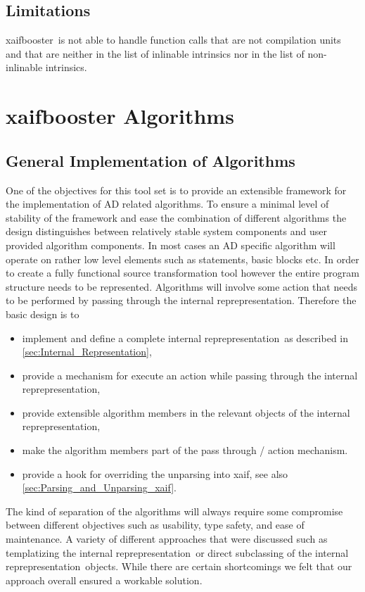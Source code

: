 \documentclass{book}
\newcommand{\InternalRep}{internal reprepresentation}
\newcommand{\xaif}{xaif}
\newcommand{\xaifbooster}{xaifbooster}
\begin{document}
\section{Limitations}
\label{sec:xaifbooster_limitations}

\xaifbooster~is not able to handle function calls that are not
compilation units
and that are neither
in the list of inlinable intrinsics nor in the list of non-inlinable
intrinsics.

\chapter{xaifbooster Algorithms}

\section{General Implementation of Algorithms}
\label{sec:General_Implementation_of_Algorithms}

One of the objectives for this tool set is to provide an extensible framework 
for the implementation of AD related algorithms. To ensure a minimal level 
of stability of the framework and ease the combination of different algorithms
the design distinguishes between relatively stable system components 
and user provided algorithm components. 
In most cases an AD specific algorithm will operate on rather low level 
elements such as statements, basic blocks etc. In order to create a fully functional 
source transformation tool however the entire program structure needs to be 
represented. 
Algorithms will involve some action that needs to be 
performed by passing through the \InternalRep.
Therefore the basic design is to 
\begin{itemize}
\item implement and define a complete \InternalRep\ as described in \ref{sec:Internal_Representation},
\item provide a mechanism for execute an action while passing through the \InternalRep,
\item provide extensible algorithm members in the relevant objects of the \InternalRep,
\item make the algorithm members part of the pass through / action mechanism.
\item provide a hook for overriding the unparsing into \xaif, see also \ref{sec:Parsing_and_Unparsing_xaif}.
\end{itemize}
The kind of separation of the algorithms will always require some compromise 
between different objectives such as usability, type safety, and ease of maintenance. 
A variety of different approaches that were discussed such as templatizing the 
\InternalRep\ or direct subclassing of the \InternalRep\ objects. While there are 
certain shortcomings we felt that our approach overall ensured a workable solution.
\end{document}
